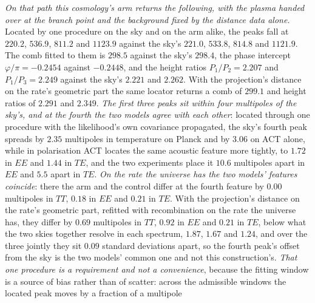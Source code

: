 \documentclass[11pt,a4paper]{article}
\theoremstyle{plain}
\theoremstyle{definition}
\theoremstyle{remark}
\begin{document}
\emph{On that path this cosmology's arm returns the following, with the plasma handed over at the branch
point and the background fixed by the distance data alone.}
Located by one procedure on the sky and on the arm alike, the peaks fall at $220.2$, $536.9$, $811.2$ and $1123.9$ against the sky's $221.0$, $533.8$, $814.8$ and $1121.9$.
The comb fitted to them is $298.5$ against the sky's $298.4$,
the phase intercept $\varphi/\pi=-0.2454$ against $-0.2448$, and the height ratios $P_{1}/P_{2}=2.207$ and
$P_{1}/P_{3}=2.249$ against the sky's $2.221$ and $2.262$. With the projection's distance on the rate's geometric part the same locator returns a comb of $299.1$ and height ratios of $2.291$ and $2.349$. \emph{The first three peaks sit within four multipoles of the sky's, and at the fourth the two models agree with each other}: located through one
procedure with the likelihood's own covariance propagated, the sky's fourth peak spreads by $2.35$ multipoles in
temperature on Planck and by $3.06$ on ACT alone, while in polarisation ACT locates the same acoustic feature more
tightly, to $1.72$ in $EE$ and $1.44$ in $TE$, and the two experiments place it $10.6$ multipoles apart in $EE$ and
$5.5$ apart in $TE$. \emph{On the rate the universe has the two models' features coincide}: there the arm and the control differ at the
fourth feature by $0.00$ multipoles in $TT$, $0.18$ in $EE$ and $0.21$ in $TE$. With the projection's
distance on the rate's geometric part, refitted with
recombination on the rate the universe has, they differ by $0.69$ multipoles in $TT$,
$0.92$ in $EE$ and $0.21$ in $TE$, below what the two skies together resolve in each spectrum, $1.87$, $1.67$ and
$1.24$, and over the three jointly they sit $0.09$ standard deviations apart, so the fourth peak's offset from the
sky is the two models' common one and not this construction's.
\emph{That one procedure is a requirement and not a convenience}, because the fitting window is a source of
bias rather than of scatter: across the admissible windows the located peak moves by a fraction of a multipole
\end{document}
